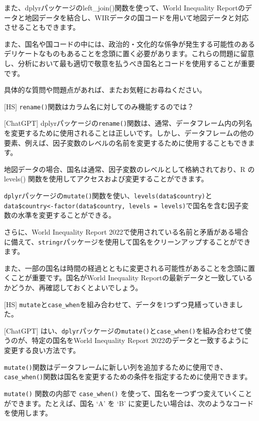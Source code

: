 \documentclass[
]{bxjsbook}
\theoremstyle{definition}
\theoremstyle{definition}
\theoremstyle{definition}
\theoremstyle{definition}
\theoremstyle{remark}
\begin{document}
また、dplyrパッケージのleft\_join()関数を使って、World Inequality Reportのデータと地図データを結合し、WIRデータの国コードを用いて地図データと対応させることもできます。

また、国名や国コードの中には、政治的・文化的な係争が発生する可能性のあるデリケートなものもあることを念頭に置く必要があります。これらの問題に留意し、分析において最も適切で敬意を払うべき国名とコードを使用することが重要です。

具体的な質問や問題点があれば、またお気軽にお尋ねください。

{[}HS{]} \texttt{rename()}関数はカラム名に対してのみ機能するのでは？

{[}ChatGPT{]} dplyrパッケージの\texttt{rename()}関数は、通常、データフレーム内の列名を変更するために使用されることは正しいです。しかし、データフレームの他の要素、例えば、因子変数のレベルの名前を変更するために使用することもできます。

地図データの場合、国名は通常、因子変数のレベルとして格納されており、R の levels() 関数を使用してアクセスおよび変更することができます。

\texttt{dplyr}パッケージの\texttt{mutate()}関数を使い、\texttt{levels(data\$country)}と\texttt{data\$country\textless{}-factor(data\$country,\ levels\ =\ levels)}で国名を含む因子変数の水準を変更することができる。

さらに、World Inequality Report 2022で使用されている名前と矛盾がある場合に備えて、\texttt{stringr}パッケージを使用して国名をクリーンアップすることができます。

また、一部の国名は時間の経過とともに変更される可能性があることを念頭に置くことが重要です。国名がWorld Inequality Reportの最新データと一致しているかどうか、再確認しておくとよいでしょう。

{[}HS{]} \texttt{mutate}と\texttt{case\_when}を組み合わせて、データを1つずつ見繕っていきました。

{[}ChatGPT{]} はい、\texttt{dplyr}パッケージの\texttt{mutate()}と\texttt{case\_when()}を組み合わせて使うのが、特定の国名をWorld Inequality Report 2022のデータと一致するように変更する良い方法です。

\texttt{mutate()}関数はデータフレームに新しい列を追加するために使用でき、\texttt{case\_when()}関数は国名を変更するための条件を指定するために使用できます。

\texttt{mutate()} 関数の内部で \texttt{case\_when()} を使って、国名を一つずつ変えていくことができます。たとえば、国名 `A' を `B' に変更したい場合は、次のようなコードを使用します。
\end{document}
